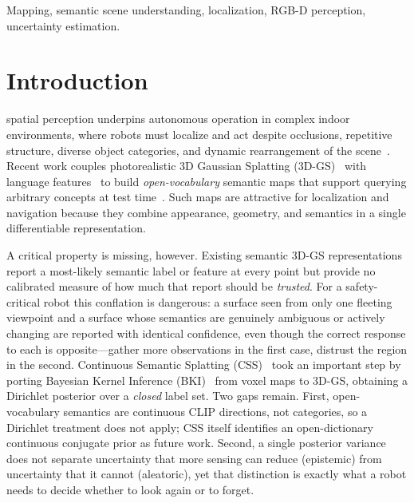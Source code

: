 \documentclass[journal]{IEEEtran}
\begin{document}
\begin{IEEEkeywords}
Mapping, semantic scene understanding, localization, RGB-D perception,
uncertainty estimation.
\end{IEEEkeywords}

\section{Introduction}
 spatial perception underpins autonomous operation in
complex indoor environments, where robots must localize and act despite
occlusions, repetitive structure, diverse object categories, and dynamic
rearrangement of the scene~\cite{chu2026semantic}. Recent work couples
photorealistic 3D Gaussian Splatting (3D-GS)~\cite{kerbl2023} with language
features~\cite{radford2021} to build \emph{open-vocabulary} semantic maps that
support querying arbitrary concepts at test time~\cite{qin2024langsplat,
zhou2024feature, wu2024opengaussian}. Such maps are attractive for localization
and navigation because they combine appearance, geometry, and semantics in a
single differentiable representation.

A critical property is missing, however. Existing semantic 3D-GS
representations report a most-likely semantic label or feature at every point but
provide no calibrated measure of how much that report should be \emph{trusted}.
For a safety-critical robot this conflation is dangerous: a surface seen from
only one fleeting viewpoint and a surface whose semantics are genuinely
ambiguous or actively changing are reported with identical confidence, even
though the correct response to each is opposite---gather more observations in the
first case, distrust the region in the second. Continuous Semantic Splatting
(CSS)~\cite{wilson2025css} took an important step by porting Bayesian Kernel
Inference (BKI)~\cite{vegabrown2014, gan2020bayesian} from voxel maps to 3D-GS,
obtaining a Dirichlet posterior over a \emph{closed} label set. Two gaps remain.
First, open-vocabulary semantics are continuous CLIP directions, not categories,
so a Dirichlet treatment does not apply; CSS itself identifies an open-dictionary
continuous conjugate prior as future work. Second, a single posterior variance
does not separate uncertainty that more sensing can reduce (epistemic) from
uncertainty that it cannot (aleatoric), yet that distinction is exactly what a
robot needs to decide whether to look again or to forget.
\end{document}

